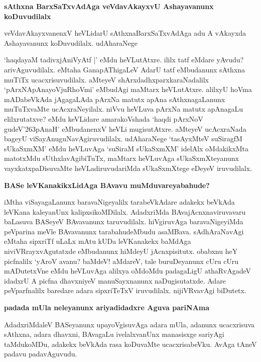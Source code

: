 {\bigskip
\noindent
{\large\bf sAthxna BarxSaTxvAdAga veVdavAkayxvU Ashayavanunx koDuvudilalx}}\label{page186}
\medskip

\noindent
veVdavAkayxvanenxV heVLidarU sAthxnaBarxSaTxvAdAga adu A vAkayxda Ashayavanunx koDuvudilalx. udAharaNege

`haqdayaM tadivxjAniVyAtf |'\label{186} eMdu heVLutAtxre. ililx tatf eMdare yAvudu? arivAguvudilalx. eMtaha GanapAThigaLeV AdarU tatf eMbudanunx sAthxna muTiTx ucacxrisuvudilalx. aMteyeV shArxdadhxparxkaraNadalilx `pArxNApAnayoVjuRhoVmi'\label{186a} eMbudAgi maMtarx heVLutAtxre. alilxyU hoVma mADabeVkAda jAgagaLAda pArxNa matutx apAna sAthxnagaLanunx muTuTxvaMte ucAcxraNeyilalx. niVvu heVLuva pArxNa matutx apAnagaLu elilxrutatxve? eMdu keVLidare amarakoVshada `haqdi pArxNoV gudeV\char'263pAnaH'\label{page186b} eMbudanenxV heVLi mugisutAtxre. aMteyeV ucAcxraNada bageyU viSayAnuguNavAgiruvudilalx. udAharaNege `tasAyxMteV suSiragfM sUkaSxmXM'\label{124} eMdu heVLuvAga `suSiraM sUkaSxmXM' idelAlx oMdakikxMta matotxMdu sUthxlavAgibiTuTx, maMtarx heVLuvAga sUkaSxmXteyanunx vayxkatxpaDisuvaMte heVLadiruvudariMda sUkaSxmXtege eDeyeV iruvudilalx. 

{\bigskip
\noindent
{\large\bf BASe leVKanakikxLidAga BAvavu muMduvareyabahude?}}\label{page186a}
\medskip

\noindent
iMtha viSayagaLanunx baravaNigeyalilx tarabeVkAdare adakekx beVkAda leVKana kaleyanUnx kalipxsikoMDilalx. AdadxriMda BAvajAcnxnaviruvavaru baLasuva BASeyeV BAvavanunx taruvudilalx. hiVgiruvAga baravaNigeyiMda peVparina meVle BAvavanunx tarabahudeMbudu asaMBava. sAdhAraNavAgi eMtaha sipxriTf uLaLx mAtu kUDa leVKanakekx baMdAga niviVRrayxvAgutatxde eMbudanunx hiMdeyU jAcnxpisitutx. obabxnu heY picfnalilx `yAroV avanu? baMdeV! aMdareV, tale buruDeyanunx cUru cUru mADutetxVne eMdu heVLuvAga alilxya oMdoMdu padagaLigU athaRvAgadeV idadxrU A picfna dhavxniyeV manuSayxnanunx naDugisutatxde. Adare peVparfnalilx baredare adara sipxriTeTxV iruvudilalx. nijiVRvavAgi biDutetx.

{\bigskip
\noindent
{\large\bf padada mUla neleyanunx ariyadidadxre Aguva pariNAma}}\label{page186c}
\medskip

\noindent
AdadxriMdaleV BASeyanunx upayoVgisuvAga adara mUla, adanunx ucacxrisuva sAthxna, adara dhavxni, BAvagaLu ivelalxvanUnx manasisxge sariyAgi taMdukoMDu, adakekx beVkAda rasa koDuvaMte ucacxrisabeVku. AvAga tAneV padavu padavAguvudu.

